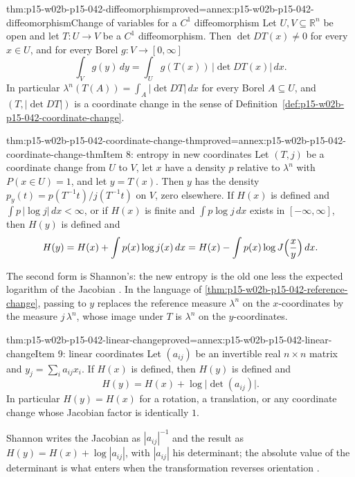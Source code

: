 \begin{hblemma}{thm:p15-w02b-p15-042-diffeomorphism}{proved=annex:p15-w02b-p15-042-diffeomorphism}{Change of variables for a \(C^1\) diffeomorphism}
Let \(U,V\subseteq\mathbb R^n\) be open and let \(T:U\to V\) be a \(C^1\)
diffeomorphism. Then \(\det DT(x)\neq0\) for every \(x\in U\), and for every
Borel \(g:V\to[0,\infty]\)
\[
 \int_V g(y)\,dy=\int_U g(T(x))\,\bigl|\det DT(x)\bigr|\,dx .
\]
In particular \(\lambda^n(T(A))=\int_A|\det DT|\,dx\) for every Borel
\(A\subseteq U\), and \((T,|\det DT|)\) is a coordinate change in the sense
of Definition~\ref{def:p15-w02b-p15-042-coordinate-change}.
\end{hblemma}

\begin{hbtheorem}{thm:p15-w02b-p15-042-coordinate-change-thm}{proved=annex:p15-w02b-p15-042-coordinate-change-thm}{Item 8: entropy in new coordinates}
Let \((T,j)\) be a coordinate change from \(U\) to \(V\), let \(x\) have a
density \(p\) relative to \(\lambda^n\) with \(P(x\in U)=1\), and let
\(y=T(x)\). Then \(y\) has the density
\(p_y(t)=p(T^{-1}t)/j(T^{-1}t)\) on \(V\), zero elsewhere. If \(H(x)\) is
defined and \(\int p\,|\log j|\,dx<\infty\), or if \(H(x)\) is finite and
\(\int p\log j\,dx\) exists in \([-\infty,\infty]\), then \(H(y)\) is defined
and
\[
 H(y)=H(x)+\int p(x)\log j(x)\,dx
     =H(x)-\int p(x)\log J\Bigl(\frac{x}{y}\Bigr)\,dx .
\]
\end{hbtheorem}

The second form is Shannon's: the new entropy is the old one less the
expected logarithm of the Jacobian \cite[sec.~20, pp.~37--38]{Shannon1948MathematicalTheory}.
In the language of \cref{thm:p15-w02b-p15-042-reference-change}, passing to
\(y\) replaces the reference measure \(\lambda^n\) on the \(x\)-coordinates by
the measure \(j\,\lambda^n\), whose image under \(T\) is \(\lambda^n\) on the
\(y\)-coordinates.

\begin{hbcorollary}{thm:p15-w02b-p15-042-linear-change}{proved=annex:p15-w02b-p15-042-linear-change}{Item 9: linear coordinates}
Let \((a_{ij})\) be an invertible real \(n\times n\) matrix and
\(y_j=\sum_ia_{ij}x_i\). If \(H(x)\) is defined, then \(H(y)\) is defined and
\[
 H(y)=H(x)+\log\bigl|\det(a_{ij})\bigr| .
\]
In particular \(H(y)=H(x)\) for a rotation, a translation, or any
coordinate change whose Jacobian factor is identically \(1\).
\end{hbcorollary}

Shannon writes the Jacobian as \(|a_{ij}|^{-1}\) and the result as
\(H(y)=H(x)+\log|a_{ij}|\), with \(|a_{ij}|\) his determinant; the absolute
value of the determinant is what enters when the transformation reverses
orientation \cite[sec.~20, p.~38]{Shannon1948MathematicalTheory}.

